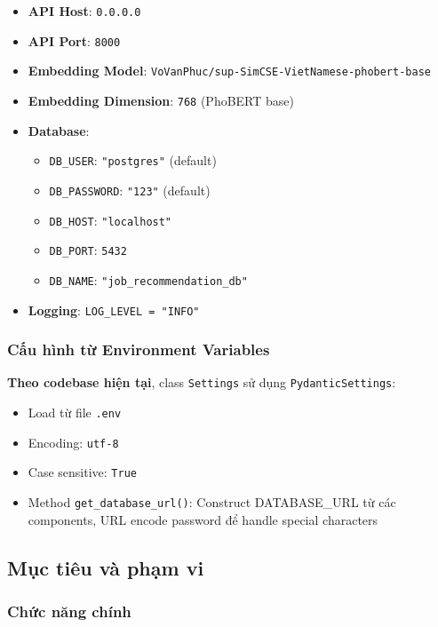 \begin{itemize}
    \item \textbf{API Host}: \texttt{0.0.0.0}
    \item \textbf{API Port}: \texttt{8000}
    \item \textbf{Embedding Model}: \texttt{VoVanPhuc/sup-SimCSE-VietNamese-phobert-base}
    \item \textbf{Embedding Dimension}: \texttt{768} (PhoBERT base)
    \item \textbf{Database}:
    \begin{itemize}
        \item \texttt{DB\_USER}: \texttt{"postgres"} (default)
        \item \texttt{DB\_PASSWORD}: \texttt{"123"} (default)
        \item \texttt{DB\_HOST}: \texttt{"localhost"}
        \item \texttt{DB\_PORT}: \texttt{5432}
        \item \texttt{DB\_NAME}: \texttt{"job\_recommendation\_db"}
    \end{itemize}
    \item \textbf{Logging}: \texttt{LOG\_LEVEL = "INFO"}
\end{itemize}

\subsubsection{Cấu hình từ Environment Variables}

\textbf{Theo codebase hiện tại}, class \texttt{Settings} sử dụng \texttt{PydanticSettings}:
\begin{itemize}
    \item Load từ file \texttt{.env}
    \item Encoding: \texttt{utf-8}
    \item Case sensitive: \texttt{True}
    \item Method \texttt{get\_database\_url()}: Construct DATABASE\_URL từ các components, URL encode password để handle special characters
\end{itemize}

\subsection{Mục tiêu và phạm vi}

\subsubsection{Chức năng chính}

